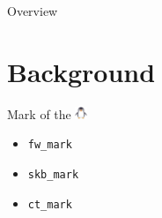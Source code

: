 \documentclass[black,white,aspectratio=169]{beamer}
\DeclareRobustCommand{\#}{\adjustbox{valign=B,totalheight=.57\baselineskip}{\oldhash}}%
\begin{document}
    \begin{frame}{Overview}
        \tableofcontents
    \end{frame}

    \section{Background}

    \begin{frame}[fragile]{Mark of the \includegraphics[height=1em]{penguin.png}}
        \begin{table}
            \begin{subtable}[l]{0.2\textwidth}
                \begin{itemize}
                    \item \verb+fw_mark+\medskip
                    \item \verb+skb_mark+\medskip
                    \item \verb+ct_mark+\medskip

\end{itemize}
\end{subtable}
\end{table}
\end{frame}
\end{document}
